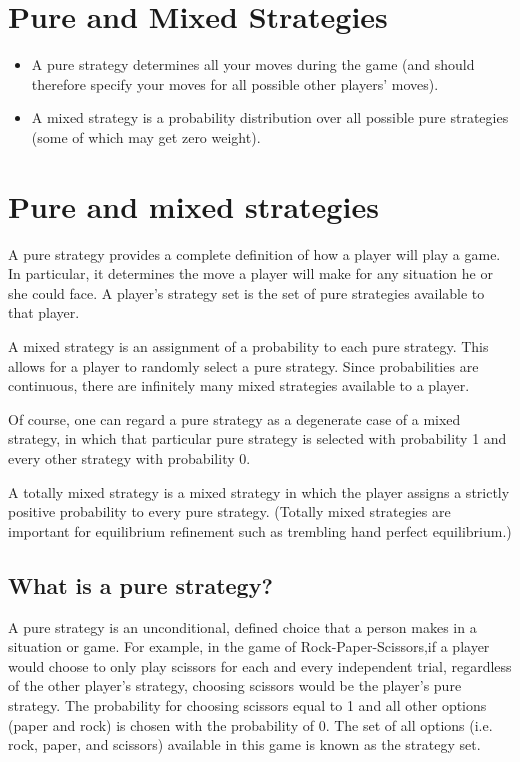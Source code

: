 \documentclass[]{report}
\begin{document}
\section{Pure and Mixed Strategies}


\begin{itemize}
\item A pure strategy determines all your moves during the game (and should therefore specify your moves for all possible other players' moves). 
\item A mixed strategy is a probability distribution over all possible pure strategies (some of which may get zero weight).
\end{itemize}


\section{Pure and mixed strategies}
A pure strategy provides a complete definition of how a player will play a game. In particular, it determines the move a player will make for any situation he or she could face. A player's strategy set is the set of pure strategies available to that player.

A mixed strategy is an assignment of a probability to each pure strategy. This allows for a player to randomly select a pure strategy. Since probabilities are continuous, there are infinitely many mixed strategies available to a player.

Of course, one can regard a pure strategy as a degenerate case of a mixed strategy, in which that particular pure strategy is selected with probability 1 and every other strategy with probability 0.

A totally mixed strategy is a mixed strategy in which the player assigns a strictly positive probability to every pure strategy. (Totally mixed strategies are important for equilibrium refinement such as trembling hand perfect equilibrium.)



\subsection{What is a pure strategy?}

A pure strategy is an unconditional, defined choice that a person makes in a situation or game. For example, in the game of Rock-Paper-Scissors,if a player would choose to only play scissors for each and every independent trial, regardless of the other player’s strategy, choosing scissors would be the player’s pure strategy. The probability for choosing scissors equal to 1 and all other options (paper and rock) is chosen with the probability of 0. The set of all options (i.e. rock, paper, and scissors) available in this game is known as the strategy set.
\end{document}
